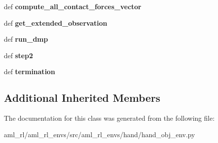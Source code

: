 \begin{DoxyCompactItemize}
\item 
\hypertarget{classaml__rl__envs_1_1hand_1_1hand__obj__env_1_1_hand_obj_env_a5c93f5f7f5785cfb79574b0a8d45cb91}{def {\bfseries compute\-\_\-all\-\_\-contact\-\_\-forces\-\_\-vector}}\label{classaml__rl__envs_1_1hand_1_1hand__obj__env_1_1_hand_obj_env_a5c93f5f7f5785cfb79574b0a8d45cb91}

\item 
\hypertarget{classaml__rl__envs_1_1hand_1_1hand__obj__env_1_1_hand_obj_env_a4a629b8cd7f6c6ec86430fee8e0c80f0}{def {\bfseries get\-\_\-extended\-\_\-observation}}\label{classaml__rl__envs_1_1hand_1_1hand__obj__env_1_1_hand_obj_env_a4a629b8cd7f6c6ec86430fee8e0c80f0}

\item 
\hypertarget{classaml__rl__envs_1_1hand_1_1hand__obj__env_1_1_hand_obj_env_a570d20e5289653cd8c86c3a0d3b2b7fa}{def {\bfseries run\-\_\-dmp}}\label{classaml__rl__envs_1_1hand_1_1hand__obj__env_1_1_hand_obj_env_a570d20e5289653cd8c86c3a0d3b2b7fa}

\item 
\hypertarget{classaml__rl__envs_1_1hand_1_1hand__obj__env_1_1_hand_obj_env_a45632076a25c11e03bb8e18600010071}{def {\bfseries step2}}\label{classaml__rl__envs_1_1hand_1_1hand__obj__env_1_1_hand_obj_env_a45632076a25c11e03bb8e18600010071}

\item 
\hypertarget{classaml__rl__envs_1_1hand_1_1hand__obj__env_1_1_hand_obj_env_a3754cb2d62eae3cad2f19762e93af490}{def {\bfseries termination}}\label{classaml__rl__envs_1_1hand_1_1hand__obj__env_1_1_hand_obj_env_a3754cb2d62eae3cad2f19762e93af490}

\end{DoxyCompactItemize}
\subsection*{Additional Inherited Members}


The documentation for this class was generated from the following file\-:\begin{DoxyCompactItemize}
\item 
aml\-\_\-rl/aml\-\_\-rl\-\_\-envs/src/aml\-\_\-rl\-\_\-envs/hand/hand\-\_\-obj\-\_\-env.\-py\end{DoxyCompactItemize}
